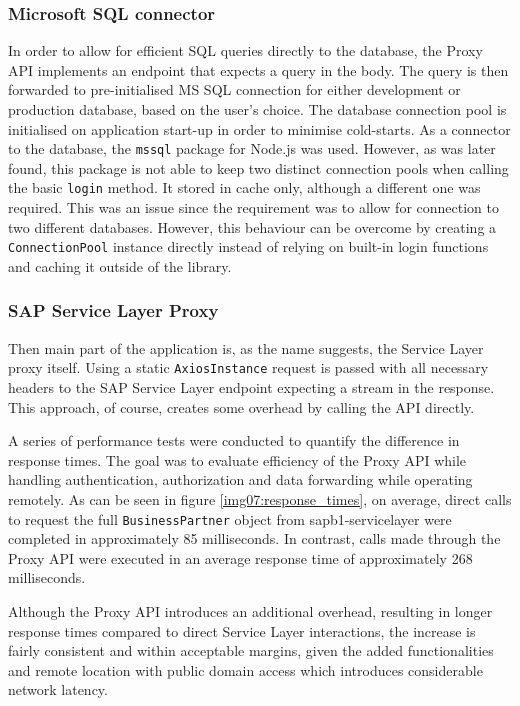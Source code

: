 \subsubsection{Microsoft SQL connector}
In order to allow for efficient SQL queries directly to the database, the Proxy API implements an endpoint that expects a query in the body.
The query is then forwarded to pre-initialised \ac{MS} SQL connection for either development or production database, based on the user's choice. 
The database connection pool is initialised on application start-up in order to minimise cold-starts.
As a connector to the database, the \texttt{\gls{mssql}} package for Node.js was used. However, as was later found, this package is not able to keep two distinct connection pools when calling the basic \texttt{login} method.
It stored in cache only, although a different one was required. This was an issue since the requirement was to allow for connection to two different databases. 
However, this behaviour can be overcome by creating a \texttt{ConnectionPool} instance directly instead of relying on built-in login functions and caching it outside of the library.

\subsubsection{SAP Service Layer Proxy}
Then main part of the application is, as the name suggests, the Service Layer proxy itself. 
Using a static \texttt{\gls{AxiosInstance}} request is passed with all necessary headers to the SAP Service Layer endpoint expecting a stream in the response.
This approach, of course, creates some overhead by calling the API directly. 

A series of performance tests were conducted to quantify the difference in response times. 
The goal was to evaluate efficiency of the Proxy API while handling authentication, authorization and data forwarding while operating remotely. 
As can be seen in figure \ref{img07:response_times}, on average, direct calls to request the full \texttt{BusinessPartner} object from \gls{sapb1-servicelayer} were completed in approximately 85 milliseconds. 
In contrast, calls made through the Proxy API were executed in an average response time of approximately 268 milliseconds.

Although the Proxy API introduces an additional overhead, resulting in longer response times compared to direct Service Layer interactions, the increase is fairly consistent and within acceptable margins, given the added functionalities and remote location with public domain access which introduces considerable network latency.
%

